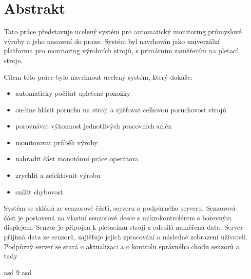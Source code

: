 \documentclass[12pt, a4paper]{article}
\begin{document}



\newpage

\section*{Abstrakt}
Tato práce představuje ucelený systém pro automatický monitoring průmyslové výroby a
    jeho nasazení do praxe.
Systém byl navrhován jako univerzální platforma pro monitoring výrobních strojů, s primárním zaměřením na pletací stroje.

Cílem této práce bylo navrhnout ucelený systém, který dokáže:

\begin{itemize}
    \item automaticky počítat upletené ponožky
    \item on-line hlásit poruchu na stroji a zjišťovat celkovou poruchovost strojů
    \item porovnávat výkonnost jednotlivých pracovních směn
    \item monitorovat průběh výroby
    \item nahradit část monotónní práce operátora
    \item zrychlit a zefektivnit výrobu
    \item snížit chybovost
\end{itemize}

Systém se skládá ze senzorové části, serveru a podpůrného serveru.
Senzorová část je postavená na vlastní senzorové desce s
mikrokontrolérem s barevným displejem. Senzor je připojen k pletacímu stroji a odesílá naměřená data.
Server přijímá  data ze senzorů, zajišťuje jejich zpracování a následné zobrazení uživateli.
Podpůrný server se stará o aktualizaci a o kontrolu správného chodu senzorů a
tady

asd 9 asd
\end{document}
